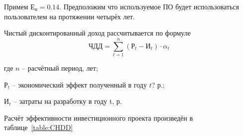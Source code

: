 \def \stavkaBankov {0.1376}
Примем $\text{Е}_\text{н} = \num{0.14}$.
Предположим что используемое ПО будет использоваться пользователем на протяжении
четырёх лет.

Чистый дисконтированный доход рассчитывается по формуле
\begin{equation}
	\text{ЧДД} = \sum^{n}_{t = 1} (\text{Р}_t - \text{И}_t) \cdot \alpha_t
\end{equation}
\begin{explanationx}
	\item[где] $n$ -- расчётный период, лет;
	\item $\text{Р}_t$ -- экономический эффект полученный в году $t$? р.;
	\item $\text{И}_t$ -- затраты на разработку в году t, р.
\end{explanationx}

Расчёт эффективности инвестиционного проекта произведён в таблице~\ref{table:CHDD}

